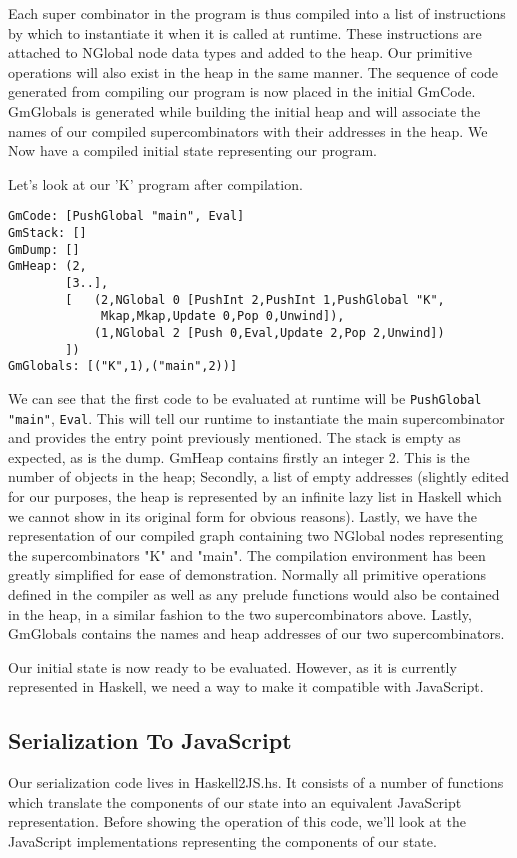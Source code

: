 Each super combinator in the program is thus compiled into
a list of instructions by which to instantiate it when it
is called at runtime. These instructions are attached to
NGlobal node data types and added to the heap. Our primitive
operations will also exist in the heap in the same manner.
The sequence of code generated from compiling our program
is now placed in the initial GmCode. GmGlobals is generated
while building the initial heap and will associate the names
of our compiled supercombinators with their addresses in the
heap. We Now have a compiled initial state representing our
program. 

Let's look at our 'K' program after compilation.

\begin{verbatim}
GmCode: [PushGlobal "main", Eval]
GmStack: []
GmDump: []
GmHeap: (2, 
        [3..],  
        [   (2,NGlobal 0 [PushInt 2,PushInt 1,PushGlobal "K",
             Mkap,Mkap,Update 0,Pop 0,Unwind]),
            (1,NGlobal 2 [Push 0,Eval,Update 2,Pop 2,Unwind])
        ])
GmGlobals: [("K",1),("main",2))]

\end{verbatim}

\noindent We can see that the first code to be evaluated at 
runtime will be 
\verb!PushGlobal! \verb!"main"!, \verb!Eval!. 
This will tell our runtime
to instantiate the main supercombinator and provides the entry
point previously mentioned. The stack is empty as expected,
as is the dump. GmHeap contains firstly an integer 2. This 
is the number of objects in the heap; Secondly, a list of
empty addresses (slightly edited for our purposes, the heap 
is represented by an infinite lazy list in Haskell which we
cannot show in its original form for obvious reasons). Lastly,
we have the representation of our compiled graph containing two
NGlobal nodes representing the supercombinators "K" and "main".
The compilation environment has been greatly simplified for
ease of demonstration. Normally all primitive operations 
defined in the compiler as well as any prelude functions would
also be contained in the heap, in a similar fashion to the
two supercombinators above. Lastly, GmGlobals contains the
names and heap addresses of our two supercombinators.

Our initial state is now ready to be evaluated. However, as
it is currently represented in Haskell, we need a way to make
it compatible with JavaScript. 

\subsection{Serialization To JavaScript}
Our serialization code lives in Haskell2JS.hs. It consists of
a number of functions which
translate the components of our state into an equivalent
JavaScript representation. Before showing the operation
of this code, we'll look at the JavaScript implementations
representing the components of our state.

